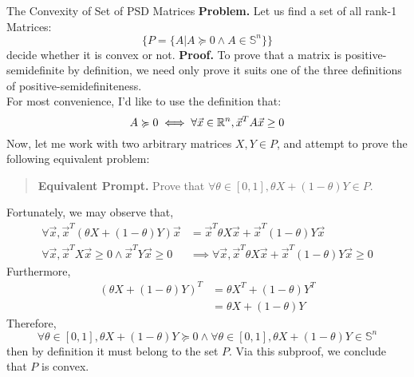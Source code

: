\begin{ln-explain}{The Convexity of Set of PSD Matrices}{}
    \textbf{Problem.} Let us find a set of all rank-1 Matrices:
    \[
        \{P = \{ A | A \succcurlyeq 0 \land A \in \mathbb{S}^n \}\}
    \]
    decide whether it is convex or not.
    \tcblower
    \textbf{Proof.}
    To prove that a matrix is positive-semidefinite by definition, we need only prove it suits one of the three definitions of positive-semidefiniteness. \\
    For most convenience, I'd like to use the definition that:
    \[
        A \succcurlyeq 0 \iff \forall \vec{x} \in \mathbb{R}^n, \vec{x}^T A \vec{x} \geq 0
    \]
    Now, let me work with two arbitrary matrices $X, Y \in P$, and attempt to prove the following equivalent problem:
    \begin{quote}
        \textbf{Equivalent Prompt.} Prove that $\forall \theta \in [0, 1], \theta X + (1 - \theta) Y \in P$.
    \end{quote}
    Fortunately, we may observe that,
    \begin{align*}
        \forall \vec{x}, \vec{x}^T (\theta X + (1 - \theta) Y) \vec{x}
        &= \vec{x}^T \theta X \vec{x} + \vec{x}^T (1 - \theta) Y \vec{x} \\
        \forall \vec{x}, \vec{x}^T X \vec{x} \geq 0 \land \vec{x}^T Y \vec{x} \geq 0 &\implies \forall \vec{x}, \vec{x}^T \theta X \vec{x} + \vec{x}^T (1 - \theta) Y \vec{x} \geq 0
    \end{align*}
    Furthermore, 
    \begin{align*}
        {(\theta X + (1 - \theta) Y)}^T &= \theta X^T + (1 - \theta) Y^T \\
        &= \theta X + (1 - \theta) Y
    \end{align*}
    Therefore,
    \[
        \forall \theta \in [0, 1], \theta X + (1 - \theta) Y \succcurlyeq 0 \land \forall \theta \in [0, 1], \theta X + (1 - \theta) Y \in \mathbb{S}^n
    \]
    then by definition it must belong to the set $P$.
    Via this subproof, we conclude that $P$ is convex.
\end{ln-explain}

